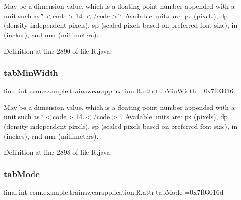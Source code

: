 May be a dimension value, which is a floating point number appended with a unit such as \char`\"{}$<$code$>$14.\+5sp$<$/code$>$\char`\"{}. Available units are\+: px (pixels), dp (density-\/independent pixels), sp (scaled pixels based on preferred font size), in (inches), and mm (millimeters). 

Definition at line 2890 of file R.\+java.

\mbox{\label{classcom_1_1example_1_1trainawearapplication_1_1_r_1_1attr_a962cab305acbc7f337ea16fd1379e89f}} 
\subsubsection{\texorpdfstring{tabMinWidth}{tabMinWidth}}
{\footnotesize\ttfamily final int com.\+example.\+trainawearapplication.\+R.\+attr.\+tab\+Min\+Width =0x7f03016c\hspace{0.3cm}{\ttfamily [static]}}

May be a dimension value, which is a floating point number appended with a unit such as \char`\"{}$<$code$>$14.\+5sp$<$/code$>$\char`\"{}. Available units are\+: px (pixels), dp (density-\/independent pixels), sp (scaled pixels based on preferred font size), in (inches), and mm (millimeters). 

Definition at line 2898 of file R.\+java.

\mbox{\label{classcom_1_1example_1_1trainawearapplication_1_1_r_1_1attr_ae946956afe3fac2b38e6db110301fa35}} 
\subsubsection{\texorpdfstring{tabMode}{tabMode}}
{\footnotesize\ttfamily final int com.\+example.\+trainawearapplication.\+R.\+attr.\+tab\+Mode =0x7f03016d\hspace{0.3cm}{\ttfamily [static]}}

